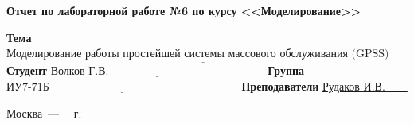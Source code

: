 \begin{titlepage}
	
	\begin{center}
		\Large\textbf{Отчет по лабораторной работе №6 по курсу <<Моделирование>>}
	\end{center}
	
	\noindent\newline\textbf{Тема} $\underline{\text{Моделирование работы простейшей системы массового обслуживания (GPSS)~~~}}$\newline\newline
	\noindent\textbf{Студент} $\underline{\text{Волков Г.В.~~~~~~~~~~~~~~~~~~~~~~~~~~~~~~~~~~~~~~~~~~}}$\newline\newline
	\noindent\textbf{Группа} $\underline{\text{ИУ7-71Б~~~~~~~~~~~~~~~~~~~~~~~~~~~~~~~~~~~~~~~~~~~~~~~~~~~}}$\newline\newline
	\noindent\textbf{Преподаватели} \underline{Рудаков И.В.~~~~}\newline
	
	\begin{center}
		\vfill
		Москва~---~\the\year
		~г.
	\end{center}
 \restoregeometry
\end{titlepage}
